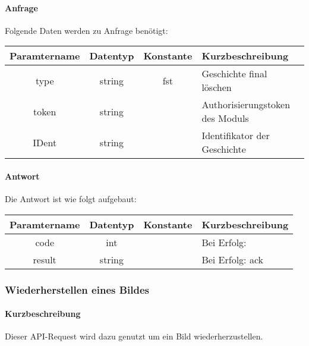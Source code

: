 \paragraph{Anfrage}Folgende Daten werden zu Anfrage benötigt:
\begin{table}[H]
	\begin{tabular}{|c|c|c|p{6.5cm}|}
		\hline
		\textbf{Paramtername} & \textbf{Datentyp} & \textbf{Konstante} & \textbf{Kurzbeschreibung}                                                                                               \\ \hline
		type                & string            & fst                & Geschichte final löschen \\ \hline
		token               & string            &                    & Authorisierungstoken des Moduls \\ \hline
		IDent               & string            &                    & Identifikator der Geschichte \\ \hline
	\end{tabular}
\end{table}
\paragraph{Antwort}Die Antwort ist wie folgt aufgebaut:
\begin{table}[H]
	\begin{tabular}{|c|c|c|p{6.5cm}|}
		\hline
		\textbf{Paramtername} & \textbf{Datentyp} & \textbf{Konstante} & \textbf{Kurzbeschreibung}            \\ \hline                
		code                & int              &                 & Bei Erfolg: {\glqq 0\grqq} \\ \hline
		result              & string           &                 & Bei Erfolg: {\glqq ack\grqq} \\ \hline
	\end{tabular}
\end{table}
\subsubsection{Wiederherstellen eines Bildes}
\paragraph{Kurzbeschreibung}Dieser API-Request wird dazu genutzt um ein Bild wiederherzustellen.

